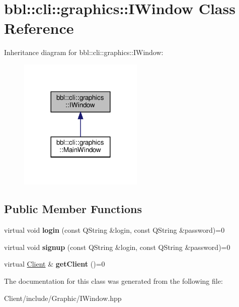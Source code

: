 \hypertarget{classbbl_1_1cli_1_1graphics_1_1_i_window}{}\section{bbl\+:\+:cli\+:\+:graphics\+:\+:I\+Window Class Reference}
\label{classbbl_1_1cli_1_1graphics_1_1_i_window}


Inheritance diagram for bbl\+:\+:cli\+:\+:graphics\+:\+:I\+Window\+:
\nopagebreak
\begin{figure}[H]
\begin{center}
\leavevmode
\includegraphics[width=168pt]{classbbl_1_1cli_1_1graphics_1_1_i_window__inherit__graph}
\end{center}
\end{figure}
\subsection*{Public Member Functions}
\begin{DoxyCompactItemize}
\item 
\mbox{\label{classbbl_1_1cli_1_1graphics_1_1_i_window_a56dd4f3ebede9e43ca66d119a0a93d52}} 
virtual void {\bfseries login} (const Q\+String \&login, const Q\+String \&password)=0
\item 
\mbox{\label{classbbl_1_1cli_1_1graphics_1_1_i_window_ac1accfd03df96f03c4d256ffa2e6cbd6}} 
virtual void {\bfseries signup} (const Q\+String \&login, const Q\+String \&password)=0
\item 
\mbox{\label{classbbl_1_1cli_1_1graphics_1_1_i_window_aff4654f7f04ae6154c47992f6ab26ae6}} 
virtual \hyperlink{classbbl_1_1cli_1_1_client}{Client} \& {\bfseries get\+Client} ()=0
\end{DoxyCompactItemize}


The documentation for this class was generated from the following file\+:\begin{DoxyCompactItemize}
\item 
Client/include/\+Graphic/I\+Window.\+hpp\end{DoxyCompactItemize}
